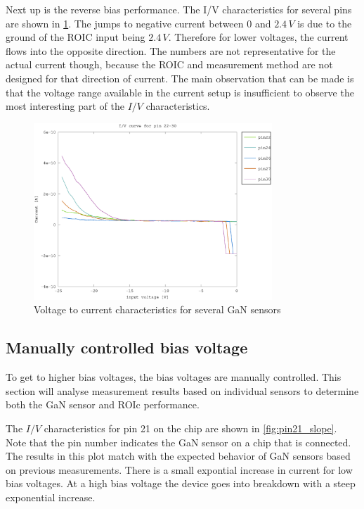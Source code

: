 Next up is the reverse bias performance. The I/V characteristics for several pins are shown in \cref{fig:pin22_30_slope}. The jumps to negative current between 0 and $2.4\,V$ is due to the ground of the ROIC input being $2.4\,V$. Therefore for lower voltages, the current flows into the opposite direction. The numbers are not representative for the actual current though, because the ROIC and measurement method are not designed for that direction of current. The main observation that can be made is that the voltage range available in the current setup is insufficient to observe the most interesting part of the $I/V$ characteristics.  

\begin{figure}[h]
	    \centering
	    \includegraphics[width=0.8\textwidth]{fig/pin22-30_slope_-25-0V.eps}
	    \caption[]%
	    {Voltage to current characteristics for several GaN sensors}    
	    \label{fig:pin22_30_slope}	
\end{figure}  



\clearpage
\subsection{Manually controlled bias voltage}
To get to higher bias voltages, the bias voltages are manually controlled. This section will analyse measurement results based on individual sensors to determine both the GaN sensor and ROIc performance. 

The $I/V$ characteristics for pin 21 on the chip are shown in \cref{fig:pin21_slope}. Note that the pin number indicates the GaN sensor on a chip that is connected. The results in this plot match with the expected behavior of GaN sensors based on previous measurements. There is a small expontial increase in current for low bias voltages. At a high bias voltage the device goes into breakdown with a steep exponential increase.


